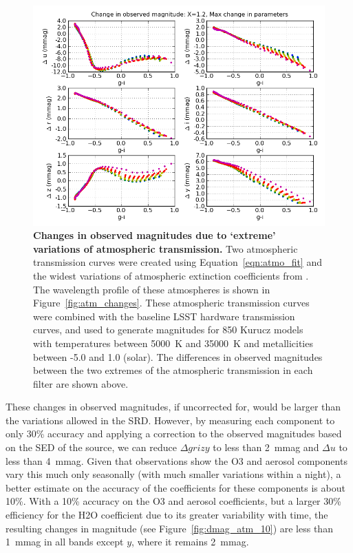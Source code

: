 \documentclass[12pt,preprint]{aastex}
\begin{document}
\begin{figure}
\centering
\includegraphics[width=6in]{delta_mags_max}
\caption{{\small
{\bf Changes in observed magnitudes due to `extreme' variations of 
atmospheric transmission.} Two atmospheric transmission curves were 
created using Equation~\ref{eqn:atmo_fit} and the widest variations of
atmospheric extinction coefficients from \citet{Burke2010b}. The wavelength
profile of these atmospheres is shown in Figure~\ref{fig:atm_changes}. 
These atmospheric transmission curves were combined with the baseline LSST 
hardware transmission curves, and used to generate magnitudes for 850 Kurucz
models with temperatures between 5000~K and 35000~K and metallicities between
-5.0 and 1.0 (solar). The differences in observed magnitudes between 
the two extremes of the atmospheric transmission in each filter are shown above. 
}}
\label{fig:dmag_atm_max}
\end{figure}

These changes in observed magnitudes, if uncorrected for, would be
larger than the variations allowed in the SRD. However, by measuring
each component to only 30\% accuracy and applying a correction to the
observed magnitudes based on the SED of the source, we can reduce
$\Delta grizy$ to less than 2~mmag and $\Delta u$ to less than 4~mmag.
Given that observations show the O3 and aerosol components vary this
much only seasonally (with much smaller variations within a night), a
better estimate on the accuracy of the coefficients for these
components is about 10\%.  With a 10\% accuracy on the O3 and aerosol
coefficients, but a larger 30\% efficiency for the H2O coefficient due
to its greater variability with time, the resulting changes in
magnitude (see Figure~\ref{fig:dmag_atm_10}) are less than 1~mmag in
all bands except $y$, where it remains 2~mmag.
\end{document}
